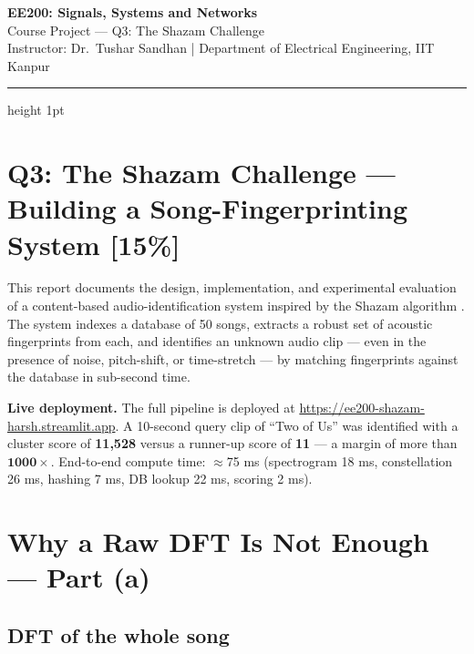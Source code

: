 \documentclass[11pt,a4paper]{article}
\begin{document}
\begin{center}
  {\LARGE\bfseries EE200: Signals, Systems and Networks}\\[4pt]
  {\normalsize Course Project — Q3: The Shazam Challenge}\\[2pt]
  {\normalsize Instructor: Dr.\ Tushar Sandhan \;|\; Department of Electrical Engineering, IIT Kanpur}
\end{center}
\vspace{2pt}
\hrule height 1pt
\vspace{10pt}

\section*{\color{titlegreen}Q3: The Shazam Challenge — Building a Song-Fingerprinting System [15\%]}

This report documents the design, implementation, and experimental evaluation of a content-based
audio-identification system inspired by the Shazam algorithm
\cite{Wang2003}. The system indexes a database of 50 songs, extracts a robust set of
acoustic fingerprints from each, and identifies an unknown audio clip — even in the
presence of noise, pitch-shift, or time-stretch — by matching fingerprints against the
database in sub-second time.

\vspace{4pt}
\begin{mdframed}[style=insightbox]
\textbf{\color{boxgreen}Live deployment.}
The full pipeline is deployed at
\url{https://ee200-shazam-harsh.streamlit.app}.
A 10-second query clip of ``Two of Us'' was identified with a cluster score of
\textbf{11{,}528} versus a runner-up score of \textbf{11} — a margin of more than
\(\mathbf{1000\times}\). End-to-end compute time: $\approx$75 ms
(spectrogram 18 ms, constellation 26 ms, hashing 7 ms, DB lookup 22 ms, scoring 2 ms).
\end{mdframed}

\section{Why a Raw DFT Is Not Enough — Part (a)}

\subsection{DFT of the whole song}
\end{document}
